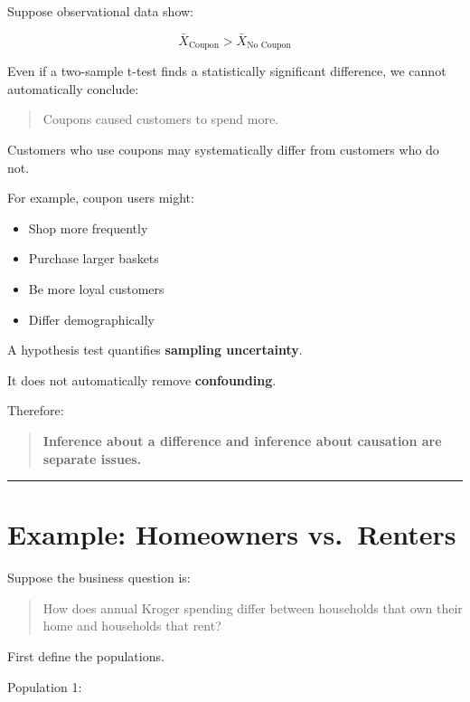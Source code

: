 \documentclass[
  letterpaper,
  DIV=11,
  numbers=noendperiod]{scrreprt}
\providecommand{\tightlist}{%
  \setlength{\itemsep}{0pt}\setlength{\parskip}{0pt}}
\begin{document}
Suppose observational data show:

\[
\bar{X}_{\text{Coupon}}
>
\bar{X}_{\text{No Coupon}}
\]

Even if a two-sample t-test finds a statistically significant
difference, we cannot automatically conclude:

\begin{quote}
Coupons caused customers to spend more.
\end{quote}

Customers who use coupons may systematically differ from customers who
do not.

For example, coupon users might:

\begin{itemize}
\tightlist
\item
  Shop more frequently
\item
  Purchase larger baskets
\item
  Be more loyal customers
\item
  Differ demographically
\end{itemize}

A hypothesis test quantifies \textbf{sampling uncertainty}.

It does not automatically remove \textbf{confounding}.

Therefore:

\begin{quote}
\textbf{Inference about a difference and inference about causation are
separate issues.}
\end{quote}

\begin{center}\rule{0.5\linewidth}{0.5pt}\end{center}


\chapter{Example: Homeowners
vs.~Renters}\label{example-homeowners-vs.-renters}

Suppose the business question is:

\begin{quote}
How does annual Kroger spending differ between households that own their
home and households that rent?
\end{quote}

First define the populations.

Population 1:
\end{document}
